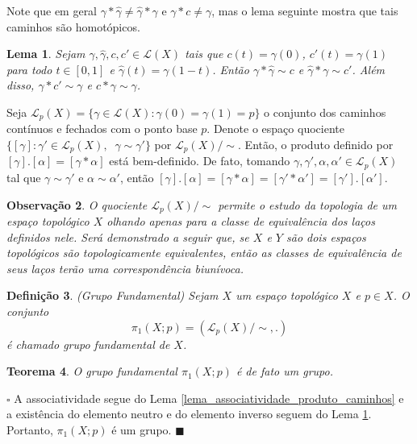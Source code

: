 \documentclass[12pt]{book}
\newtheorem{teorema}{Teorema}[section]
\newtheorem{lema}[teorema]{Lema}
\newtheorem{definicao}[teorema]{Definição}
\newtheorem{observacao}[teorema]{Observação}
\newenvironment{prova}[1]{$\square$ #1}{\hfill$\blacksquare$}
\newcommand{\caminhos}{\mathcal{L}}
\newcommand{\caminhospontobase}[1]{\caminhos_{#1}}
\newcommand{\caminhossempontobase}[1]{\caminhos(#1)}
\newcommand{\caminhospontobasegeral}[2]{\caminhos_{#1}(#2)}
\newcommand{\classe}[1]{[#1]}
\newcommand{\grupofundamentalpontobase}[2]{\pi_{1}(#1; #2)}
\newcommand{\intervalo}{[0,1]}
\begin{document}
	Note que em geral $\gamma*\hat{\gamma}\neq \hat{\gamma}*\gamma$ e $\gamma*c\neq \gamma$, mas o lema seguinte mostra que tais caminhos são homotópicos.
	
	\begin{lema}\label{lema_caminho_inverso}
		Sejam $\gamma, \hat{\gamma} , c,c' \in \caminhossempontobase{X}$ tais que $c(t) = \gamma(0)$, $c'(t) = \gamma(1)$ para todo $t\in \intervalo$ e $\hat{\gamma} (t) = \gamma(1-t)$. Então $\gamma*\hat{\gamma}  \sim c$ e $\hat{\gamma}  *\gamma\sim c'$. Além disso, $\gamma * c' \sim\gamma$ e $c * \gamma \sim \gamma$.
	\end{lema} 	
	
	Seja $\caminhospontobasegeral{p}{X} = \{\gamma\in \caminhossempontobase{X}: \gamma(0)=\gamma(1)=p \}$ o conjunto dos caminhos contínuos e fechados com o ponto base $p$. Denote o espaço quociente $\{ \classe{\gamma} : \gamma' \in \caminhospontobasegeral{p}{X},\;\;\gamma \sim \gamma'\}$ por $\caminhospontobasegeral{p}{X}/\sim $. Então, o produto definido por $\classe{\gamma}.\classe{\alpha} = \classe{\gamma*\alpha}$ está bem-definido. De fato, tomando $\gamma, \gamma',\alpha, \alpha' \in \caminhospontobasegeral{p}{X}$ tal que $\gamma \sim \gamma'$ e $\alpha \sim \alpha'$, então $\classe{\gamma}.\classe{\alpha} = \classe{\gamma*\alpha} = \classe{\gamma'*\alpha'} = \classe{\gamma'}.\classe{\alpha'}$.
	
	\begin{observacao}
		O quociente $\caminhospontobasegeral{p}{X}/\sim $ permite o estudo da topologia de um espaço topológico $X$ olhando apenas para a classe de equivalência dos laços definidos nele. Será demonstrado a seguir que, se $X$ e $Y$ são dois espaços topológicos são topologicamente equivalentes, então as classes de equivalência de seus laços terão uma correspondência biunívoca.
	\end{observacao}
	
	
	\begin{definicao}
		(Grupo Fundamental) Sejam $X$ um espaço topológico $X$ e $p\in X$. O conjunto
		$$
		\grupofundamentalpontobase{X}{p} = (\caminhospontobase{p}(X)/\sim, .)
		$$
		é chamado grupo fundamental de $X$.
	\end{definicao}
	
	\begin{teorema}
		O grupo fundamental $\grupofundamentalpontobase{X}{p}$ é de fato um grupo.
	\end{teorema}
	\begin{prova}
	A associatividade segue do Lema \ref{lema_associatividade_produto_caminhos} e a existência do elemento neutro e do elemento inverso  seguem do Lema \ref{lema_caminho_inverso}. Portanto, $\grupofundamentalpontobase{X}{p}$ é um grupo. 
	\end{prova}
	
\end{document}

